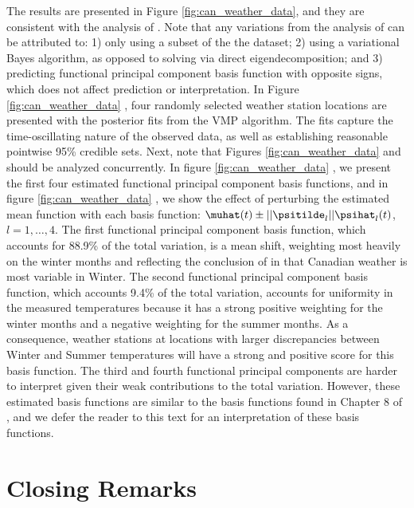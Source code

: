 \documentclass[12pt]{article}
\theoremstyle{plain}
\theoremstyle{definition}
\theoremstyle{remark}
\begin{document}
The results are presented in Figure \ref{fig:can_weather_data}, and they are consistent with the analysis of
. Note that any variations from the analysis of  can be attributed to:
1) only using a subset of the the dataset; 2) using a variational Bayes algorithm, as opposed to solving via direct
eigendecomposition; and 3) predicting functional principal component basis function with opposite signs, which
does not affect prediction or interpretation.
In Figure \ref{fig:can_weather_data} , four randomly selected weather
station locations are presented with the posterior fits from the VMP algorithm. The fits capture the time-oscillating
nature of the observed data, as well as establishing reasonable pointwise 95\% credible sets. Next, note that
Figures \ref{fig:can_weather_data}  and  should be analyzed
concurrently. In figure \ref{fig:can_weather_data} , we present the first four estimated functional
principal component basis functions, and in figure \ref{fig:can_weather_data} , we show
the effect of perturbing the estimated mean function with each basis function: $\muhat (t) \pm || \psitilde_l || \psihat_l (t)$,
$l = 1, \dots, 4$.
The first functional principal component basis function, which accounts for 88.9\% of the total variation, is a mean shift,
weighting most heavily on the winter months and reflecting the conclusion of  in that Canadian
weather is most variable in Winter.
The second functional principal component basis function, which accounts 9.4\% of the total variation, accounts for
uniformity in the measured temperatures because it has a strong positive weighting for the winter months and a
negative weighting for the summer months. As a consequence, weather stations at locations with larger discrepancies
between Winter and Summer temperatures will have a strong and positive score for this basis function.
The third and fourth functional principal components are harder to interpret given their weak contributions to the
total variation. However, these estimated basis functions are similar to the basis functions found in Chapter 8 of
, and we defer the reader to this text for an interpretation of these basis functions.


\section{Closing Remarks}
\label{sec:closing_remarks}
\end{document}

